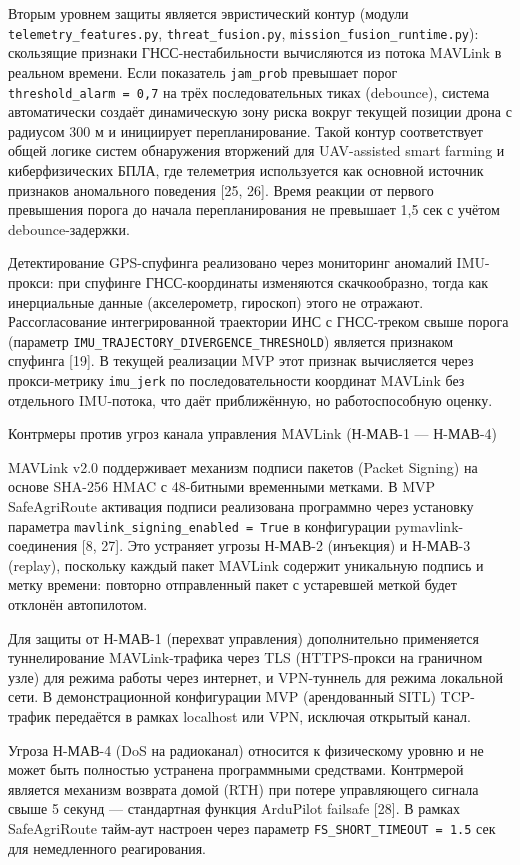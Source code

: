 \documentclass[14pt,a4paper]{extarticle}
\begin{document}
Вторым уровнем защиты является эвристический контур (модули \texttt{telemetry\_features.py}, \texttt{threat\_fusion.py}, \texttt{mission\_fusion\_runtime.py}): скользящие признаки ГНСС-нестабильности вычисляются из потока MAVLink в реальном времени. Если показатель \texttt{jam\_prob} превышает порог \texttt{threshold\_alarm\ =\ 0,7} на трёх последовательных тиках (debounce), система автоматически создаёт динамическую зону риска вокруг текущей позиции дрона с радиусом 300 м и инициирует перепланирование. Такой контур соответствует общей логике систем обнаружения вторжений для UAV-assisted smart farming и киберфизических БПЛА, где телеметрия используется как основной источник признаков аномального поведения {[}25, 26{]}. Время реакции от первого превышения порога до начала перепланирования не превышает 1,5 сек с учётом debounce-задержки.

Детектирование GPS-спуфинга реализовано через мониторинг аномалий IMU-прокси: при спуфинге ГНСС-координаты изменяются скачкообразно, тогда как инерциальные данные (акселерометр, гироскоп) этого не отражают. Рассогласование интегрированной траектории ИНС с ГНСС-треком свыше порога (параметр \texttt{IMU\_TRAJECTORY\_DIVERGENCE\_THRESHOLD}) является признаком спуфинга {[}19{]}. В текущей реализации MVP этот признак вычисляется через прокси-метрику \texttt{imu\_jerk} по последовательности координат MAVLink без отдельного IMU-потока, что даёт приближённую, но работоспособную оценку.

Контрмеры против угроз канала управления MAVLink (Н-МАВ-1 --- Н-МАВ-4)

MAVLink v2.0 поддерживает механизм подписи пакетов (Packet Signing) на основе SHA-256 HMAC с 48-битными временными метками. В MVP SafeAgriRoute активация подписи реализована программно через установку параметра \texttt{mavlink\_signing\_enabled\ =\ True} в конфигурации pymavlink-соединения {[}8, 27{]}. Это устраняет угрозы Н-МАВ-2 (инъекция) и Н-МАВ-3 (replay), поскольку каждый пакет MAVLink содержит уникальную подпись и метку времени: повторно отправленный пакет с устаревшей меткой будет отклонён автопилотом.

Для защиты от Н-МАВ-1 (перехват управления) дополнительно применяется туннелирование MAVLink-трафика через TLS (HTTPS-прокси на граничном узле) для режима работы через интернет, и VPN-туннель для режима локальной сети. В демонстрационной конфигурации MVP (арендованный SITL) TCP-трафик передаётся в рамках localhost или VPN, исключая открытый канал.

Угроза Н-МАВ-4 (DoS на радиоканал) относится к физическому уровню и не может быть полностью устранена программными средствами. Контрмерой является механизм возврата домой (RTH) при потере управляющего сигнала свыше 5 секунд --- стандартная функция ArduPilot failsafe {[}28{]}. В рамках SafeAgriRoute тайм-аут настроен через параметр \texttt{FS\_SHORT\_TIMEOUT\ =\ 1.5} сек для немедленного реагирования.
\end{document}
